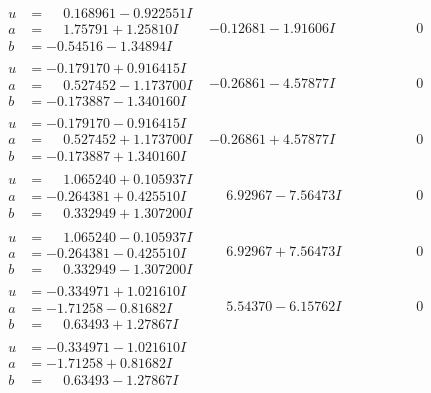 \documentclass[1p]{elsarticle_modified}
\theoremstyle{definition}
\begin{document}
$$\begin{array}{c|c|c}
\begin{aligned}
u &= \phantom{-}0.168961 - 0.922551 I \\
a &= \phantom{-}1.75791 + 1.25810 I \\
b &= -0.54516 - 1.34894 I\end{aligned}
 & -0.12681 - 1.91606 I & \phantom{-0.000000 } 0 \\ \hline\begin{aligned}
u &= -0.179170 + 0.916415 I \\
a &= \phantom{-}0.527452 - 1.173700 I \\
b &= -0.173887 - 1.340160 I\end{aligned}
 & -0.26861 - 4.57877 I & \phantom{-0.000000 } 0 \\ \hline\begin{aligned}
u &= -0.179170 - 0.916415 I \\
a &= \phantom{-}0.527452 + 1.173700 I \\
b &= -0.173887 + 1.340160 I\end{aligned}
 & -0.26861 + 4.57877 I & \phantom{-0.000000 } 0 \\ \hline\begin{aligned}
u &= \phantom{-}1.065240 + 0.105937 I \\
a &= -0.264381 + 0.425510 I \\
b &= \phantom{-}0.332949 + 1.307200 I\end{aligned}
 & \phantom{-}6.92967 - 7.56473 I & \phantom{-0.000000 } 0 \\ \hline\begin{aligned}
u &= \phantom{-}1.065240 - 0.105937 I \\
a &= -0.264381 - 0.425510 I \\
b &= \phantom{-}0.332949 - 1.307200 I\end{aligned}
 & \phantom{-}6.92967 + 7.56473 I & \phantom{-0.000000 } 0 \\ \hline\begin{aligned}
u &= -0.334971 + 1.021610 I \\
a &= -1.71258 - 0.81682 I \\
b &= \phantom{-}0.63493 + 1.27867 I\end{aligned}
 & \phantom{-}5.54370 - 6.15762 I & \phantom{-0.000000 } 0 \\ \hline\begin{aligned}
u &= -0.334971 - 1.021610 I \\
a &= -1.71258 + 0.81682 I \\
b &= \phantom{-}0.63493 - 1.27867 I\end{aligned}

\end{array}$$
\end{document}

